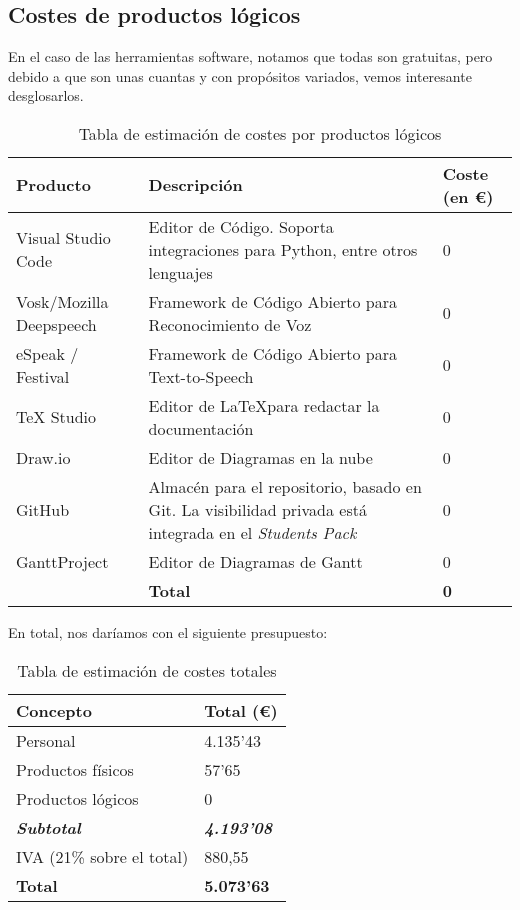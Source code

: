 \subsection{Costes de productos lógicos}
En el caso de las herramientas software, notamos que todas son gratuitas, pero debido a que son unas cuantas y con propósitos variados, vemos interesante desglosarlos.

\begin{center}
	\begin{table}[H]
		\centering
		\begin{tabularx}{\textwidth}{|l|X|X|}
			\hline
			\cellcolor{lightblue}\textbf{Producto} & \cellcolor{lightblue}\textbf{Descripción} & \cellcolor{lightblue}\textbf{Coste (en €)} \\
			\hline
			Visual Studio Code & Editor de Código. Soporta integraciones para Python, entre otros lenguajes & 0 \\
			\hline
			Vosk/Mozilla Deepspeech & Framework de Código Abierto para Reconocimiento de Voz & 0 \\
			\hline
			eSpeak / Festival & Framework de Código Abierto para Text-to-Speech & 0 \\
			\hline
			TeX Studio & Editor de \LaTeX  para redactar la documentación & 0 \\
			\hline
			Draw.io & Editor de Diagramas en la nube & 0 \\
			\hline
			GitHub & Almacén para el repositorio, basado en Git. La visibilidad privada está integrada en el \textit{Students Pack} & 0 \\
			\hline
			GanttProject & Editor de Diagramas de Gantt & 0 \\
			\hline
			& \textbf{Total} & \textbf{0} \\
			\hline
		\end{tabularx}
		\caption{Tabla de estimación de costes por productos lógicos}
	\end{table}
\end{center}

En total, nos daríamos con el siguiente presupuesto:

\begin{center}
	\begin{table}[H]
		\centering
		\begin{tabularx}{10cm}{|X|X|}
			\hline
			\cellcolor{lightblue}\textbf{Concepto} & \cellcolor{lightblue}\textbf{Total (€)}  \\
			\hline
			Personal & 4.135'43 \\
			\hline
			Productos físicos & 57'65 \\
			\hline
			Productos lógicos & 0\\
			\hline
			\textbf{\textit{Subtotal}} & \textbf{\textit{4.193'08}}\\
			\hline
			IVA (21\% sobre el total) & 880,55\\
			\hline
			\textbf{Total} & \textbf{5.073'63} \\
			\hline
		\end{tabularx}
		\caption{Tabla de estimación de costes totales}
	\end{table}
\end{center}



